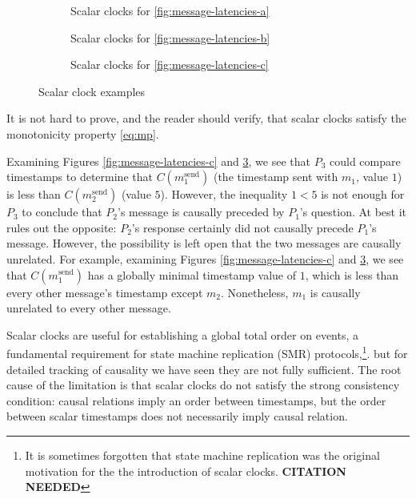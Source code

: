 \documentclass[]             %
{NASA}                       %
\theoremstyle{definition}
\begin{document}
\begin{figure}[p]
  \setlength\belowcaptionskip{5ex}

  \begin{subfigure}{1\textwidth}
    \centering 
    \caption{Scalar clocks for \ref{fig:message-latencies-a}}
    \label{fig:message-latencies-scalar-a}
  \end{subfigure}

  \begin{subfigure}{1\textwidth}
    \centering 
    \caption{Scalar clocks for \ref{fig:message-latencies-b}}
    \label{fig:message-latencies-scalar-b}
  \end{subfigure}


  \begin{subfigure}{1\textwidth}
    \centering 
    \caption{Scalar clocks for \ref{fig:message-latencies-c}}
    \label{fig:message-latencies-scalar-c}
  \end{subfigure}

  \caption{Scalar clock examples}
  \label{fig:message-latencies-scalar}
\end{figure}

\afterpage{\clearpage}

It is not hard to prove, and the reader should verify, that scalar
clocks satisfy the monotonicity property \ref{eq:mp}.

Examining Figures \ref{fig:message-latencies-c} and
\ref{fig:message-latencies-scalar-c}, we see that $P_3$ could compare
timestamps to determine that $C(m_1^\textrm{send})$ (the timestamp
sent with $m_1$, value $1$) is less than $C(m_2^\textrm{send})$ (value
$5$). However, the inequality $1 < 5$ is not enough for $P_3$ to
conclude that $P_2$'s message is causally preceded by $P_1$'s
question. At best it rules out the opposite: $P_2$'s response
certainly did not causally precede $P_1$'s message. However, the
possibility is left open that the two messages are causally
unrelated. For example, examining Figures
\ref{fig:message-latencies-c} and
\ref{fig:message-latencies-scalar-c}, we see that
$C(m_1^\textrm{send})$ has a globally minimal timestamp value of $1$,
which is less than every other message's timestamp except
$m_2$. Nonetheless, $m_1$ is causally unrelated to every other
message.

Scalar clocks are useful for establishing a global total order on
events, a fundamental requirement for state machine replication (SMR)
protocols,\footnote{It is sometimes forgotten that state machine
replication was the original motivation for the the introduction of
scalar clocks. \textbf{CITATION
  NEEDED}}. %
but for detailed tracking of causality we have seen they are not
fully sufficient. The root cause of the limitation is that scalar
clocks do not satisfy the strong consistency condition: causal
relations imply an order between timestamps, but the order between
scalar timestamps does not necessarily imply causal
relation.
\end{document}
